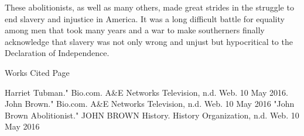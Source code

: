 \documentclass[a4paper]{article}
\begin{document}
These abolitionists, as well as many others, made great strides in the struggle to end slavery and injustice in America. It was a long difficult battle for equality among men that took many years and a war to make southerners finally acknowledge that slavery was not only wrong and unjust but hypocritical to the Declaration of Independence.	



Works Cited Page 



Harriet Tubman." Bio.com. A&E Networks Television, n.d. Web. 10 May 2016.
John Brown." Bio.com. A&E Networks Television, n.d. Web. 10 May 2016
"John Brown Abolitionist." JOHN BROWN History. History Organization, n.d. Web. 10 May 2016 
\end{document}
